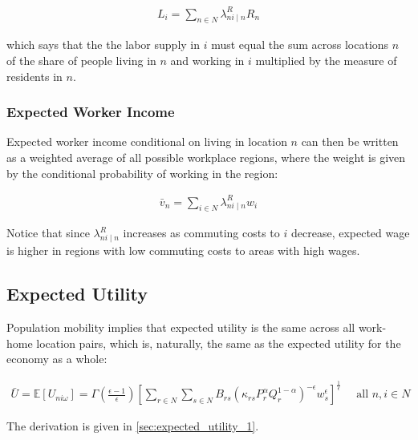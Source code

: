 \documentclass[10pt]{article}
\begin{document}
\begin{align}
    L_i=\sum_{n \in N} \lambda_{n i \mid n}^R R_n
\end{align}

which says that the 
the labor supply in $i$
must equal the sum across locations $n$ of 
the share of people living in $n$ 
and working in $i$ multiplied by
the measure of residents in $n$.

\subsubsection{Expected Worker Income}

Expected worker income
conditional on living in location $n$ 
can then be written as a weighted 
average of all possible workplace regions,
where the weight is given by the conditional probability 
of working in the region:

\begin{align}
    \bar{v}_n=\sum_{i \in N} \lambda_{n i \mid n}^R w_i
\end{align}

Notice that since $\lambda_{n i \mid n}^R$ increases 
as commuting costs to $i$ decrease, expected 
wage is higher in regions with 
low commuting costs to areas with high wages.

\subsection{Expected Utility}

Population mobility implies 
that expected utility 
is the same across 
all work-home location pairs,
which is, naturally, the same as the expected 
utility for the economy as a whole:

\begin{align}
    \bar{U}=\mathbb{E}\left[U_{n i \omega}\right]=\Gamma\left(\frac{\epsilon-1}{\epsilon}\right)\left[\sum_{r \in N} \sum_{s \in N} B_{r s}\left(\kappa_{r s} P_r^\alpha Q_r^{1-\alpha}\right)^{-\epsilon} w_s^\epsilon\right]^{\frac{1}{\epsilon}} \quad \text { all } n, i \in N \label{eq:expected_utility_1}
\end{align}

The derivation is given in \autoref{sec:expected_utility_1}.


\end{document}
